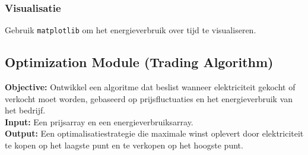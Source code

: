 \documentclass[../main.tex]{subfiles}
\begin{document}
\subsubsection{Visualisatie}
Gebruik \texttt{matplotlib} om het energieverbruik over tijd te visualiseren.

\subsection{Optimization Module (Trading Algorithm)}
\textbf{Objective:} Ontwikkel een algoritme dat beslist wanneer elektriciteit gekocht of verkocht moet worden, gebaseerd op prijsfluctuaties en het energieverbruik van het bedrijf. \\
\textbf{Input:} Een prijsarray en een energieverbruiksarray. \\
\textbf{Output:} Een optimalisatiestrategie die maximale winst oplevert door elektriciteit te kopen op het laagste punt en te verkopen op het hoogste punt.
\end{document}
